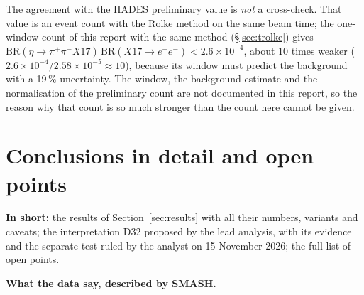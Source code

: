 \documentclass[11pt,a4paper]{article}
\newcommand{\ee}{\ensuremath{e^{+}e^{-}}\xspace}
\newcommand{\pipi}{\ensuremath{\pi^{+}\pi^{-}}\xspace}
\newcommand{\BRX}{\ensuremath{\mathrm{BR}(\eta\to\pipi X17)\,\mathrm{BR}(X17\to\ee)}\xspace}
\newcommand{\tipbox}[1]{\par\noindent\colorbox{blue!6}{\parbox{\dimexpr\linewidth-2\fboxsep\relax}{#1}}\par}
\newcommand{\inshort}[1]{\tipbox{\textbf{In short:} #1}}%
\begin{document}
The agreement with the HADES preliminary value is \emph{not} a cross-check. That value is an event count with the Rolke method on the same beam
time; the one-window count of this report with the same method (\S\ref{sec:trolke}) gives $\BRX<2.6\times10^{-4}$, about 10 times weaker
($2.6\times10^{-4}/2.58\times10^{-5}\approx10$), because its window must predict the background with a 19\,\% uncertainty. The window, the
background estimate and the normalisation of the preliminary count are not documented in this report, so the reason why that count is so much
stronger than the count here cannot be given.

\section{Conclusions in detail and open points}
\label{sec:concl}
\inshort{the results of Section~\ref{sec:results} with all their numbers, variants and caveats; the interpretation D32 proposed by the lead analysis, with its evidence and the separate test ruled by the analyst on 15 November 2026; the full list of open points.}
\textbf{What the data say, described by SMASH.}
\end{document}
